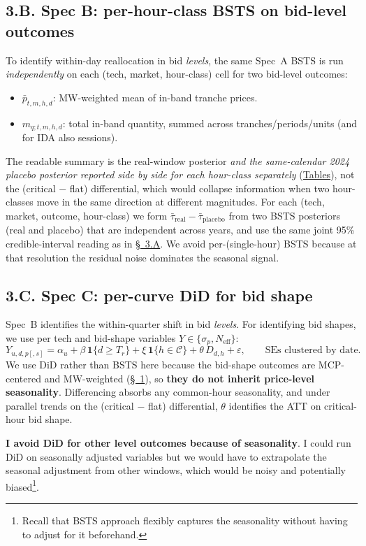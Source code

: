 \documentclass[11pt]{article}
\begin{document}
\subsection*{3.B. Spec B: per-hour-class BSTS on bid-level outcomes}\label{sec:smart_desc}
To identify within-day reallocation in bid \emph{levels}, the same Spec~A BSTS is run \emph{independently} on each (tech, market, hour-class) cell for two bid-level outcomes:
\begin{itemize}\setlength{\itemsep}{1pt}
  \item $\bar p_{t,m,h,d}$: MW-weighted mean of in-band tranche prices.
  \item $m_{q;t,m,h,d}$: total in-band quantity, summed across tranches/periods/units (and for IDA also sessions).
\end{itemize}
The readable summary is the real-window posterior \emph{and the same-calendar 2024 placebo posterior reported side by side for each hour-class separately} (\hyperref[tab:specB-id15]{Tables}), not the (critical $-$ flat) differential, which would collapse information when two hour-classes move in the same direction at different magnitudes. For each (tech, market, outcome, hour-class) we form $\bar\tau_{\text{real}} - \bar\tau_{\text{placebo}}$ from two BSTS posteriors (real and placebo) that are independent across years, and use the same joint 95\% credible-interval reading as in \hyperref[sec:bsts]{\S~3.A}. We avoid per-(single-hour) BSTS because at that resolution the residual noise dominates the seasonal signal.

\subsection*{3.C. Spec C: per-curve DiD for bid shape}\label{sec:did}
Spec~B identifies the within-quarter shift in bid \emph{levels}. For identifying bid shapes, we use per tech and bid-shape variables $Y\in\{\sigma_p, N_{\text{eff}}\}$:
\[
Y_{u,d,p[,s]} = \alpha_u + \beta\,\mathbf{1}\{d\ge T_r\} + \xi\,\mathbf{1}\{h\in\mathcal{C}\} + \theta\,D_{d,h} + \varepsilon, \qquad \text{SEs clustered by date.}
\]
We use DiD rather than BSTS here because the bid-shape outcomes are MCP-centered and MW-weighted (\hyperref[sec:setup]{\S~1}), so \textbf{they do not inherit price-level seasonality}. Differencing absorbs any common-hour seasonality, and under parallel trends on the (critical $-$ flat) differential, $\theta$ identifies the ATT on critical-hour bid shape. 

\textbf{I avoid DiD for other level outcomes because of seasonality}. I could run DiD on seasonally adjusted variables but we would have to extrapolate the seasonal adjustment from other windows, which would be noisy and potentially biased\footnote{Recall that BSTS approach flexibly captures the seasonality without having to adjust for it beforehand.}.
\end{document}
